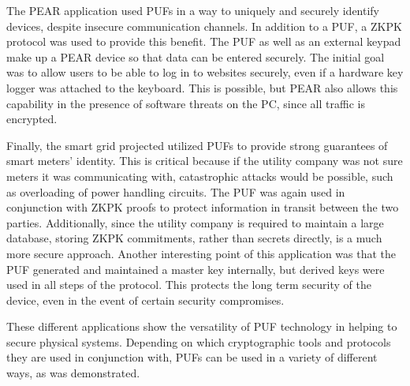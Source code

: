 The PEAR application used PUFs in a way to uniquely and securely identify devices, despite insecure communication
channels. In addition to a PUF, a ZKPK protocol was used to provide this benefit. The PUF as well as an external keypad
make up a PEAR device so that data can be entered securely. The initial goal was to allow users to be able to log in
to websites securely, even if a hardware key logger was attached to the keyboard. This is possible, but PEAR also
allows this capability in the presence of software threats on the PC, since all traffic is encrypted.

Finally, the smart grid projected utilized PUFs to provide strong guarantees of smart meters' identity. This is critical
because if the utility company was not sure meters it was communicating with, catastrophic attacks would be possible,
such as overloading of power handling circuits. The PUF was again used in conjunction with ZKPK proofs to
protect information in transit between the two parties. Additionally, since the utility company is required to maintain
a large database, storing ZKPK commitments, rather than secrets directly, is a much more secure approach. Another
interesting point of this application was that the PUF generated and maintained a master key internally, 
but derived keys were used in all steps of the protocol. This protects the long term security of the device, even in the 
event of certain security compromises.

These different applications show the versatility of PUF technology in helping to secure physical systems.
Depending on which cryptographic tools and protocols they are used in conjunction with, PUFs can be used
in a variety of different ways, as was demonstrated.